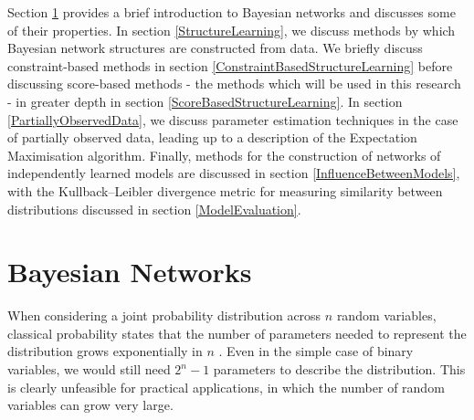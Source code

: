 \documentclass [11pt]{article}
\begin{document}
Section \ref{BayesianNetworks} provides a brief introduction to Bayesian networks and discusses some of their properties. In section \ref{StructureLearning}, we discuss methods by which Bayesian network structures are constructed from data. We briefly discuss constraint-based methods in section \ref{ConstraintBasedStructureLearning} before discussing score-based methods - the methods which will be used in this research - in greater depth in section \ref{ScoreBasedStructureLearning}. In section \ref{PartiallyObservedData}, we discuss parameter estimation techniques in the case of partially observed data, leading up to a description of the Expectation Maximisation algorithm. Finally, methods for the construction of networks of independently learned models are discussed in section \ref{InfluenceBetweenModels}, with the Kullback–Leibler divergence metric for measuring similarity between distributions discussed in section \ref{ModelEvaluation}.
\section{Bayesian Networks}\label{BayesianNetworks}
When considering a joint probability distribution across $n$ random variables, classical probability states that the number of parameters needed to represent the distribution grows exponentially in $n$ \citep{koller09}. Even in the simple case of binary variables, we would still need $2^n -1$ parameters to describe the distribution. This is clearly unfeasible for practical applications, in which the number of random variables can grow very large. 
\end{document}
